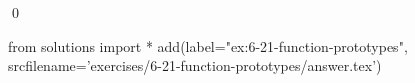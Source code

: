 
\begin{ex}
  \label{ex:6-21-function-prototypes}
  
  \qed
\end{ex}
\begin{python0}
from solutions import *
add(label="ex:6-21-function-prototypes",
    srcfilename='exercises/6-21-function-prototypes/answer.tex')
\end{python0}
